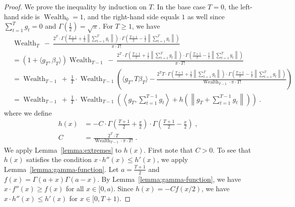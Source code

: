 \documentclass{article}
\DeclareMathOperator{\Wealth}{Wealth}
\begin{document}
\begin{proof}
We prove the inequality by induction on $T$. In the base case $T=0$, the
left-hand side is $\Wealth_0 = 1$, and the right-hand side equals $1$
as well since $\sum_{t=1}^T g_t = 0$ and $\Gamma(\frac{1}{2}) = \sqrt{\pi}$.
For $T \ge 1$, we have
\begin{align*}
& \Wealth_T \ - \ \frac{2^T \cdot \Gamma \left(\frac{T+1}{2} + \frac{1}{2}\left\|\sum_{t=1}^T g_t \right\| \right) \cdot \Gamma \left(\frac{T+1}{2} - \frac{1}{2} \left\|\sum_{t=1}^T g_t \right\| \right)}{\pi \cdot T!} \\
& = (1 + \langle g_T, \beta_T \rangle) \Wealth_{T-1} \ - \ \frac{2^T \cdot \Gamma \left(\frac{T+1}{2} + \frac{1}{2}\left\|\sum_{t=1}^T g_t \right\| \right) \cdot \Gamma \left(\frac{T+1}{2} - \frac{1}{2} \left\|\sum_{t=1}^T g_t \right\| \right)}{\pi \cdot T!} \\
& = \Wealth_{T-1} \ + \ \frac{1}{T} \cdot \Wealth_{T-1} \left(\langle g_T, T \beta_T \rangle - \frac{2^T T \cdot \Gamma \left(\frac{T+1}{2} + \frac{1}{2}\left\|\sum_{t=1}^T g_t \right\| \right) \cdot \Gamma \left(\frac{T+1}{2} - \frac{1}{2} \left\|\sum_{t=1}^T g_t \right\| \right)}{\Wealth_{T-1} \cdot \pi \cdot T!} \right) \\
& = \Wealth_{T-1} \ + \ \frac{1}{T} \cdot \Wealth_{T-1} \left( \left\langle g_T, \sum_{t=1}^{T-1} g_t \right\rangle + h\left( \left\|g_T + \sum_{t=1}^{T-1} g_t \right\| \right) \right) \; .
\end{align*}
where we define
\begin{align*}
h(x) & = - C \cdot \Gamma \left(\frac{T+1}{2} + \frac{x}{2} \right) \cdot \Gamma \left(\frac{T+1}{2} - \frac{x}{2} \right) \; ,  \\
C & = \frac{2^T \cdot T}{\Wealth_{T-1} \cdot \pi \cdot T!} \; .
\end{align*}
We apply Lemma~\ref{lemma:extremes} to $h(x)$. First note that $C > 0$.
To see that $h(x)$ satisfies the condition $x \cdot h''(x) \le h'(x)$, we apply
Lemma~\ref{lemma:gamma-function}. Let $a = \frac{T+1}{2}$ and $f(x) =
\Gamma(a+x) \Gamma(a-x)$. By Lemma~\ref{lemma:gamma-function}, we have $x \cdot f''(x)
\ge f(x)$ for all $x \in [0,a)$. Since $h(x) = - C f(x/2)$, we have $x \cdot
h''(x) \le h'(x)$ for $x \in [0,T+1)$.


\end{proof}
\end{document}

